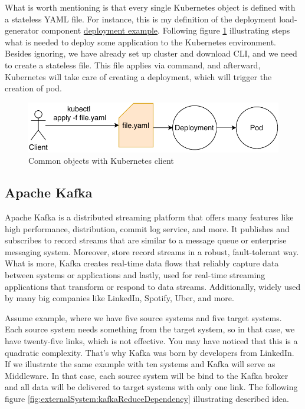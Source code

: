 \documentclass{ExcelAtFIT}
\begin{document}
What is worth mentioning is that every single Kubernetes object is defined with a stateless YAML file. For instance, this is my definition of the deployment load-generator component \href{https://github.com/see-quick/bachelor-thesis/blob/master/install/01-quarkus-load-generator-deployment.yaml}{deployment example}. Following figure \ref{fig:strizmi:kubernetesDeploy} illustrating steps what is needed to deploy some application to the Kubernetes environment. Besides ignoring, we have already set up cluster and download CLI, and we need to create a stateless file. This file applies via command, and afterward, Kubernetes will take care of creating a deployment, which will trigger the creation of pod.

\begin{figure}[h!]
	\centering
	\includegraphics[width=1\linewidth]{images/02-strimzi/applyCommandBigh.pdf}
	\caption{Common objects with Kubernetes client}
	\label{fig:strizmi:kubernetesDeploy}
\end{figure}

\subsection{Apache Kafka} 

Apache Kafka\cite{Kafka} is a distributed streaming platform that offers many features like high performance, distribution, commit log service, and more. It publishes and subscribes to record streams that are similar to a message queue or enterprise messaging system. Moreover, store record streams in a robust, fault-tolerant way. What is more, Kafka\cite{KafkaBook} creates real-time data flows that reliably capture data between systems or applications and lastly, used for real-time streaming applications that transform or respond to data streams. Additionally, widely used by many big companies like LinkedIn, Spotify, Uber, and more.

Assume example, where we have five source systems and five target systems. Each source system needs something from the target system, so in that case, we have twenty-five links, which is not effective. You may have noticed that this is a quadratic complexity. That's why Kafka was born by developers from LinkedIn. If we illustrate the same example with ten systems and Kafka will serve as Middleware. In that case, each source system will be bind to the Kafka broker and all data will be delivered to target systems with only one link. The following figure \ref{fig:externalSystem:kafkaReduceDependency} illustrating described idea.
\end{document}
